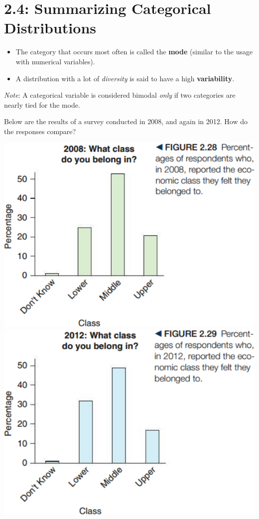 \documentclass[../mathNotesPreamble]{subfiles}
\providecommand{\relscalefact}{1.4}
\begin{document}
\relscale{\relscalefact}
  \section{2.4: Summarizing Categorical Distributions}
  \begin{defn*}
    \begin{itemize}
      \item The category that occurs most often is called the \textbf{mode} (similar to the usage with numerical variables).
      \item A distribution with a lot of \emph{diversity} is said to have a high \textbf{variability}.
    \end{itemize}
  \end{defn*}

  \emph{Note}: A categorical variable is considered bimodal \emph{only} if two categories are nearly tied for the mode.
  \vspace*{\baselineskip}

  \begin{ex*}
    Below are the results of a survey conducted in 2008, and again in 2012. How do the responses compare?
  \end{ex*}

  \begin{center}
    \includegraphics[width=0.425\linewidth]{images/math211_figure_2p28}
    \includegraphics[width=0.425\linewidth]{images/math211_figure_2p29}
  \end{center}
  \pagebreak
\end{document}
